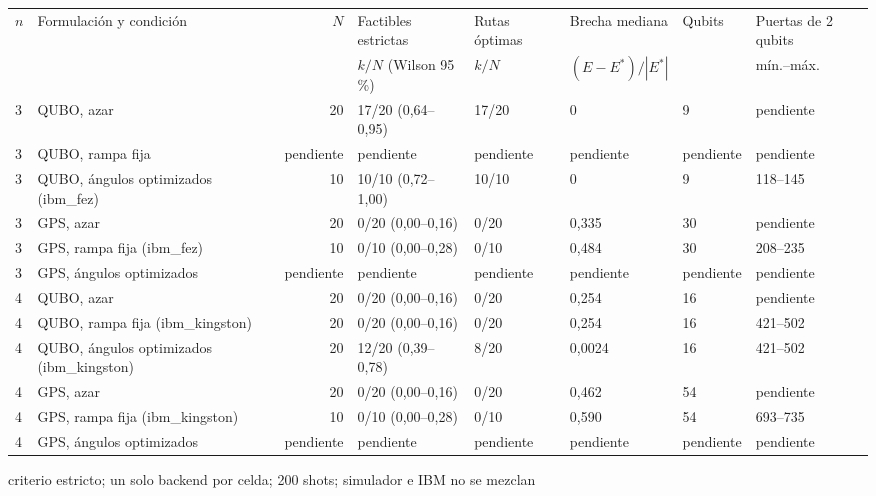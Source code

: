 \documentclass{article}
\begin{document}
\begin{table}[ht]
\centering
\begin{tabular}{@{}llrlllll@{}}
\toprule
$n$ & Formulación y condición & $N$ & Factibles estrictas & Rutas óptimas & Brecha mediana & Qubits & Puertas de 2 qubits \\
 &  &  & $k/N$ (Wilson 95\,\%) & $k/N$ & $(E-E^*)/|E^*|$ &  & mín.--máx. \\
\midrule
3 & QUBO, azar & 20 & 17/20 (0{,}64--0{,}95) & 17/20 & 0 & 9 & pendiente \\
3 & QUBO, rampa fija & pendiente & pendiente & pendiente & pendiente & pendiente & pendiente \\
3 & QUBO, ángulos optimizados (ibm_fez) & 10 & 10/10 (0{,}72--1{,}00) & 10/10 & 0 & 9 & 118--145 \\
3 & GPS, azar & 20 & 0/20 (0{,}00--0{,}16) & 0/20 & 0{,}335 & 30 & pendiente \\
3 & GPS, rampa fija (ibm_fez) & 10 & 0/10 (0{,}00--0{,}28) & 0/10 & 0{,}484 & 30 & 208--235 \\
3 & GPS, ángulos optimizados & pendiente & pendiente & pendiente & pendiente & pendiente & pendiente \\
\midrule
4 & QUBO, azar & 20 & 0/20 (0{,}00--0{,}16) & 0/20 & 0{,}254 & 16 & pendiente \\
4 & QUBO, rampa fija (ibm_kingston) & 20 & 0/20 (0{,}00--0{,}16) & 0/20 & 0{,}254 & 16 & 421--502 \\
4 & QUBO, ángulos optimizados (ibm_kingston) & 20 & 12/20 (0{,}39--0{,}78) & 8/20 & 0{,}0024 & 16 & 421--502 \\
4 & GPS, azar & 20 & 0/20 (0{,}00--0{,}16) & 0/20 & 0{,}462 & 54 & pendiente \\
4 & GPS, rampa fija (ibm_kingston) & 10 & 0/10 (0{,}00--0{,}28) & 0/10 & 0{,}590 & 54 & 693--735 \\
4 & GPS, ángulos optimizados & pendiente & pendiente & pendiente & pendiente & pendiente & pendiente \\
\bottomrule
\end{tabular}
\par\vspace{0.5em}
{\normalsize criterio estricto; un solo backend por celda; 200 shots; simulador e IBM no se mezclan\par}
\end{table}
\end{document}
